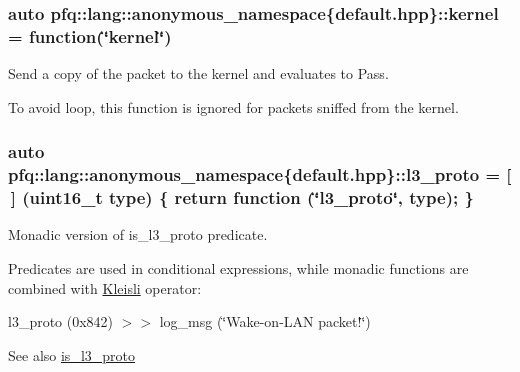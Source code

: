 \subsubsection[{\texorpdfstring{kernel}{kernel}}]{\setlength{\rightskip}{0pt plus 5cm}auto pfq\+::lang\+::anonymous\+\_\+namespace\{default.\+hpp\}\+::kernel = {\bf function}(\char`\"{}kernel\char`\"{})}\hypertarget{namespacepfq_1_1lang_1_1anonymous__namespace_02default_8hpp_03_a93294225145f96c6aa6cf0cedfa19103}{}\label{namespacepfq_1_1lang_1_1anonymous__namespace_02default_8hpp_03_a93294225145f96c6aa6cf0cedfa19103}


Send a copy of the packet to the kernel and evaluates to {\ttfamily Pass}. 

To avoid loop, this function is ignored for packets sniffed from the kernel. 
\subsubsection[{\texorpdfstring{l3\+\_\+proto}{l3_proto}}]{\setlength{\rightskip}{0pt plus 5cm}auto pfq\+::lang\+::anonymous\+\_\+namespace\{default.\+hpp\}\+::l3\+\_\+proto = \mbox{[}$\,$\mbox{]} (uint16\+\_\+t type) \{ return {\bf function} (\char`\"{}l3\+\_\+proto\char`\"{}, type); \}}\hypertarget{namespacepfq_1_1lang_1_1anonymous__namespace_02default_8hpp_03_a1515f230673119530cd04f213627976f}{}\label{namespacepfq_1_1lang_1_1anonymous__namespace_02default_8hpp_03_a1515f230673119530cd04f213627976f}


Monadic version of {\ttfamily is\+\_\+l3\+\_\+proto} predicate. 

Predicates are used in conditional expressions, while monadic functions are combined with \hyperlink{structpfq_1_1lang_1_1Kleisli}{Kleisli} operator\+:

l3\+\_\+proto (0x842) $>$$>$ log\+\_\+msg (\char`\"{}\+Wake-\/on-\/\+L\+A\+N packet!\char`\"{})

\begin{DoxySeeAlso}{See also}
\hyperlink{namespacepfq_1_1lang_1_1anonymous__namespace_02default_8hpp_03_a814bb9c3c833dc2af342d695b1d503e8}{is\+\_\+l3\+\_\+proto} 
\end{DoxySeeAlso}
